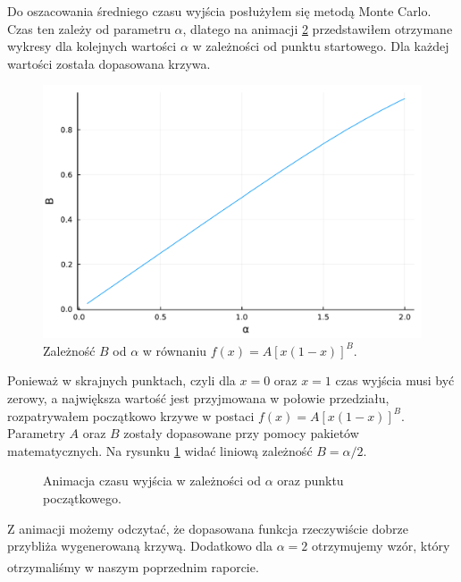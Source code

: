 \documentclass[12pt]{mwrep}
\begin{document}
	\noindent Do oszacowania średniego czasu wyjścia posłużyłem się metodą Monte Carlo. Czas ten zależy od parametru $\alpha$, dlatego na animacji \ref{anim:time} przedstawiłem otrzymane wykresy dla kolejnych wartości $\alpha$ w zależności od punktu startowego. Dla każdej wartości została dopasowana krzywa.
	\begin{figure}
		\includegraphics[width=\textwidth]{fig/plot/A_B.pdf}
		\caption{Zależność $B$ od $\alpha$ w równaniu $f(x)=A\left[x(1-x)\right]^B$.}
		\label{eq:A_B}
	\end{figure}
	Ponieważ w skrajnych punktach, czyli dla $x=0$ oraz $x=1$ czas wyjścia musi być zerowy, a największa wartość jest przyjmowana w połowie przedziału, rozpatrywałem początkowo krzywe w postaci $f(x)=A\left[x(1-x)\right]^B$. Parametry $A$ oraz $B$ zostały dopasowane przy pomocy pakietów matematycznych. Na rysunku \ref{eq:A_B} widać liniową zależność $B=\alpha/2$. 
	\begin{figure}[H]
		\caption{Animacja czasu wyjścia w zależności od $\alpha$ oraz punktu początkowego.}\label{anim:time}
	\end{figure}
	\noindent Z animacji możemy odczytać, że dopasowana funkcja rzeczywiście dobrze przybliża wygenerowaną krzywą. Dodatkowo dla $\alpha=2$ otrzymujemy wzór, który otrzymaliśmy w naszym poprzednim raporcie\textsuperscript{\cite{rap}}.
	
\end{document}
